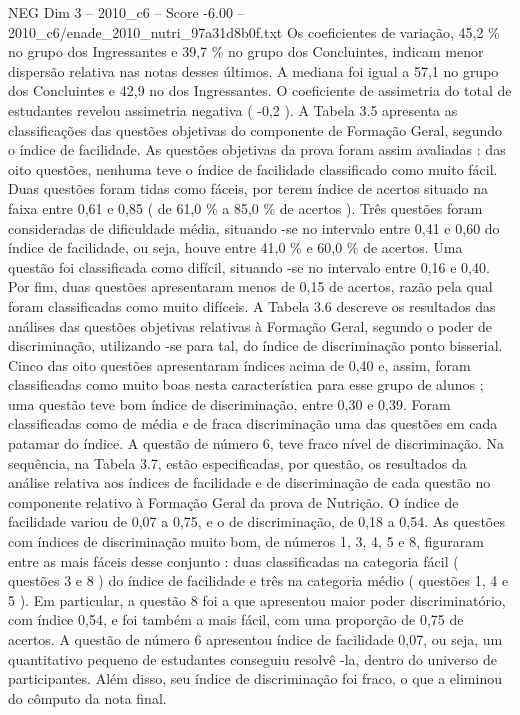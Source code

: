 \begin{textsample}{NEG Dim 3 – 2010\_c6 – Score -6.00 – 2010\_c6/enade\_2010\_nutri\_97a31d8b0f.txt}
Os coeficientes de variação, 45,2 \% no grupo dos Ingressantes e 39,7 \% no grupo dos Concluintes, indicam menor dispersão relativa nas notas desses últimos.
A mediana foi igual a 57,1 no grupo dos Concluintes e 42,9 no dos Ingressantes.
O coeficiente de assimetria do total de estudantes revelou assimetria negativa ( -0,2 ).
A Tabela 3.5 apresenta as classificações das questões objetivas do componente de Formação Geral, segundo o índice de facilidade.
As questões objetivas da prova foram assim avaliadas : das oito questões, nenhuma teve o índice de facilidade classificado como muito fácil.
Duas questões foram tidas como fáceis, por terem índice de acertos situado na faixa entre 0,61 e 0,85 ( de 61,0 \% a 85,0 \% de acertos ).
Três questões foram consideradas de dificuldade média, situando -se no intervalo entre 0,41 e 0,60 do índice de facilidade, ou seja, houve entre 41,0 \% e 60,0 \% de acertos.
Uma questão foi classificada como difícil, situando -se no intervalo entre 0,16 e 0,40.
Por fim, duas questões apresentaram menos de 0,15 de acertos, razão pela qual foram classificadas como muito difíceis.
A Tabela 3.6 descreve os resultados das análises das questões objetivas relativas à Formação Geral, segundo o poder de discriminação, utilizando -se para tal, do índice de discriminação ponto bisserial.
Cinco das oito questões apresentaram índices acima de 0,40 e, assim, foram classificadas como muito boas nesta característica para esse grupo de alunos ; uma questão teve bom índice de discriminação, entre 0,30 e 0,39.
Foram classificadas como de média e de fraca discriminação uma das questões em cada patamar do índice.
A questão de número 6, teve fraco nível de discriminação.
Na sequência, na Tabela 3.7, estão especificadas, por questão, os resultados da análise relativa aos índices de facilidade e de discriminação de cada questão no componente relativo à Formação Geral da prova de Nutrição.
O índice de facilidade variou de 0,07 a 0,75, e o de discriminação, de 0,18 a 0,54.
As questões com índices de discriminação muito bom, de números 1, 3, 4, 5 e 8, figuraram entre as mais fáceis desse conjunto : duas classificadas na categoria fácil ( questões 3 e 8 ) do índice de facilidade e três na categoria médio ( questões 1, 4 e 5 ).
Em particular, a questão 8 foi a que apresentou maior poder discriminatório, com índice 0,54, e foi também a mais fácil, com uma proporção de 0,75 de acertos.
A questão de número 6 apresentou índice de facilidade 0,07, ou seja, um quantitativo pequeno de estudantes conseguiu resolvê -la, dentro do universo de participantes.
Além disso, seu índice de discriminação foi fraco, o que a eliminou do cômputo da nota final.

\end{textsample}
